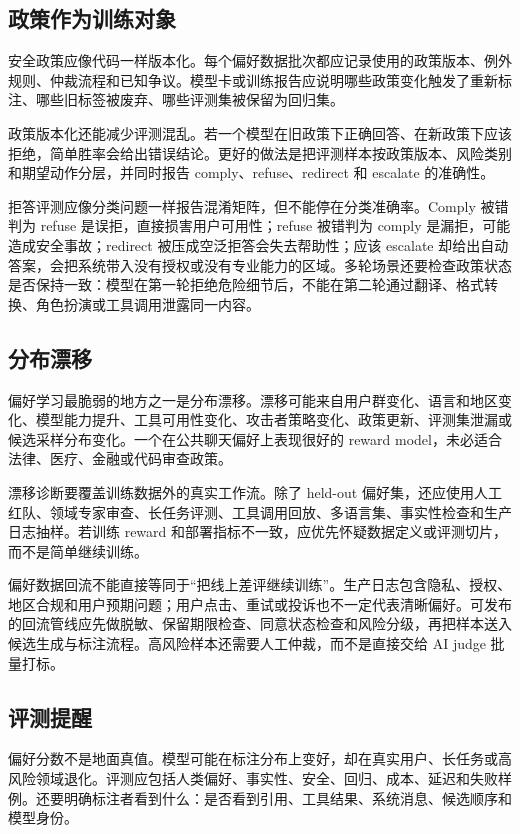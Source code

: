 \documentclass[UTF8,zihao=-4,openany]{ctexbook}
\begin{document}
\subsection{政策作为训练对象}
安全政策应像代码一样版本化。每个偏好数据批次都应记录使用的政策版本、例外规则、仲裁流程和已知争议。模型卡或训练报告应说明哪些政策变化触发了重新标注、哪些旧标签被废弃、哪些评测集被保留为回归集。

政策版本化还能减少评测混乱。若一个模型在旧政策下正确回答、在新政策下应该拒绝，简单胜率会给出错误结论。更好的做法是把评测样本按政策版本、风险类别和期望动作分层，并同时报告 comply、refuse、redirect 和 escalate 的准确性。

拒答评测应像分类问题一样报告混淆矩阵，但不能停在分类准确率。Comply 被错判为 refuse 是误拒，直接损害用户可用性；refuse 被错判为 comply 是漏拒，可能造成安全事故；redirect 被压成空泛拒答会失去帮助性；应该 escalate 却给出自动答案，会把系统带入没有授权或没有专业能力的区域。多轮场景还要检查政策状态是否保持一致：模型在第一轮拒绝危险细节后，不能在第二轮通过翻译、格式转换、角色扮演或工具调用泄露同一内容。

\subsection{分布漂移}
偏好学习最脆弱的地方之一是分布漂移。漂移可能来自用户群变化、语言和地区变化、模型能力提升、工具可用性变化、攻击者策略变化、政策更新、评测集泄漏或候选采样分布变化。一个在公共聊天偏好上表现很好的 reward model，未必适合法律、医疗、金融或代码审查政策。

漂移诊断要覆盖训练数据外的真实工作流。除了 held-out 偏好集，还应使用人工红队、领域专家审查、长任务评测、工具调用回放、多语言集、事实性检查和生产日志抽样。若训练 reward 和部署指标不一致，应优先怀疑数据定义或评测切片，而不是简单继续训练。

偏好数据回流不能直接等同于“把线上差评继续训练”。生产日志包含隐私、授权、地区合规和用户预期问题；用户点击、重试或投诉也不一定代表清晰偏好。可发布的回流管线应先做脱敏、保留期限检查、同意状态检查和风险分级，再把样本送入候选生成与标注流程。高风险样本还需要人工仲裁，而不是直接交给 AI judge 批量打标。

\subsection{评测提醒}
偏好分数不是地面真值。模型可能在标注分布上变好，却在真实用户、长任务或高风险领域退化。评测应包括人类偏好、事实性、安全、回归、成本、延迟和失败样例。还要明确标注者看到什么：是否看到引用、工具结果、系统消息、候选顺序和模型身份。
\end{document}
